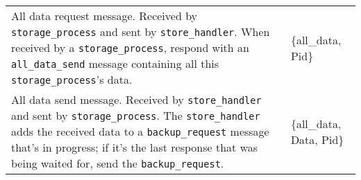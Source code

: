 \documentclass[12pt,letterpaper]{article}
\renewcommand{\tt}[1]{\texttt{#1}}
\newcommand{\sh}{\tt{store\_handler}}
\renewcommand{\sp}{\tt{storage\_process}}
\begin{document}
\begin{longtable}{p{4.5in}T}
All data request message.  Received by \sp{} and sent by \sh.  When received by a \sp, respond with an \tt{all\_data\_send} message containing all this \sp's data.  & \{all\_data, Pid\} \\

All data send message.  Received by \sh{} and sent by \sp.  The \sh{} adds the received data to a \tt{backup\_request} message that's in progress; if it's the last response that was being waited for, send the \tt{backup\_request}. & \{all\_data, Data, Pid\}



%

\end{longtable}
\end{document}
